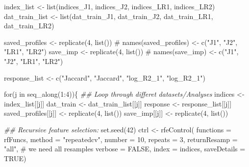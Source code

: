 \documentclass[
  letterpaper,
  DIV=11,
  numbers=noendperiod]{scrreprt}
\newenvironment{Shaded}{\begin{snugshade}}{\end{snugshade}}
\newcommand{\AttributeTok}[1]{\textcolor[rgb]{0.40,0.45,0.13}{#1}}
\newcommand{\CommentTok}[1]{\textcolor[rgb]{0.37,0.37,0.37}{#1}}
\newcommand{\ConstantTok}[1]{\textcolor[rgb]{0.56,0.35,0.01}{#1}}
\newcommand{\ControlFlowTok}[1]{\textcolor[rgb]{0.00,0.23,0.31}{#1}}
\newcommand{\DecValTok}[1]{\textcolor[rgb]{0.68,0.00,0.00}{#1}}
\newcommand{\DocumentationTok}[1]{\textcolor[rgb]{0.37,0.37,0.37}{\textit{#1}}}
\newcommand{\FunctionTok}[1]{\textcolor[rgb]{0.28,0.35,0.67}{#1}}
\newcommand{\NormalTok}[1]{\textcolor[rgb]{0.00,0.23,0.31}{#1}}
\newcommand{\OtherTok}[1]{\textcolor[rgb]{0.00,0.23,0.31}{#1}}
\newcommand{\SpecialCharTok}[1]{\textcolor[rgb]{0.37,0.37,0.37}{#1}}
\newcommand{\StringTok}[1]{\textcolor[rgb]{0.13,0.47,0.30}{#1}}
\begin{document}
\begin{Shaded}
\begin{Highlighting}[]
\NormalTok{index\_list }\OtherTok{\textless{}{-}} \FunctionTok{list}\NormalTok{(indices\_J1, indices\_J2, indices\_LR1, indices\_LR2)}
\NormalTok{dat\_train\_list }\OtherTok{\textless{}{-}} \FunctionTok{list}\NormalTok{(dat\_train\_J1, dat\_train\_J2, dat\_train\_LR1, dat\_train\_LR2)}

\NormalTok{saved\_profiles }\OtherTok{\textless{}{-}} \FunctionTok{replicate}\NormalTok{(}\DecValTok{4}\NormalTok{, }\FunctionTok{list}\NormalTok{())}
\CommentTok{\# names(saved\_profiles) \textless{}{-} c("J1", "J2", "LR1", "LR2")}
\NormalTok{save\_imp }\OtherTok{\textless{}{-}} \FunctionTok{replicate}\NormalTok{(}\DecValTok{4}\NormalTok{, }\FunctionTok{list}\NormalTok{())}
\CommentTok{\# names(save\_imp) \textless{}{-} c("J1", "J2", "LR1", "LR2")}

\NormalTok{response\_list }\OtherTok{\textless{}{-}} \FunctionTok{c}\NormalTok{(}\StringTok{"Jaccard"}\NormalTok{, }\StringTok{"Jaccard"}\NormalTok{, }\StringTok{"log\_R2\_1"}\NormalTok{, }\StringTok{"log\_R2\_1"}\NormalTok{)}

\ControlFlowTok{for}\NormalTok{(j }\ControlFlowTok{in} \FunctionTok{seq\_along}\NormalTok{(}\DecValTok{1}\SpecialCharTok{:}\DecValTok{4}\NormalTok{))\{}
  \DocumentationTok{\#\# Loop through differet datasets/Analyses}
\NormalTok{  indices }\OtherTok{\textless{}{-}}\NormalTok{ index\_list[[j]]}
\NormalTok{  dat\_train }\OtherTok{\textless{}{-}}\NormalTok{ dat\_train\_list[[j]]}
\NormalTok{  response }\OtherTok{\textless{}{-}}\NormalTok{ response\_list[[j]] }
\NormalTok{  saved\_profiles[[j]] }\OtherTok{\textless{}{-}} \FunctionTok{replicate}\NormalTok{(}\DecValTok{4}\NormalTok{, }\FunctionTok{list}\NormalTok{())}
\NormalTok{  save\_imp[[j]] }\OtherTok{\textless{}{-}} \FunctionTok{replicate}\NormalTok{(}\DecValTok{4}\NormalTok{, }\FunctionTok{list}\NormalTok{())}
  
  \DocumentationTok{\#\# Recursive feature selection:}
  \FunctionTok{set.seed}\NormalTok{(}\DecValTok{42}\NormalTok{)}
\NormalTok{  ctrl }\OtherTok{\textless{}{-}} \FunctionTok{rfeControl}\NormalTok{(}
    \AttributeTok{functions =}\NormalTok{ rfFuncs,}
    \AttributeTok{method =} \StringTok{"repeatedcv"}\NormalTok{,}
    \AttributeTok{number =} \DecValTok{10}\NormalTok{,}
    \AttributeTok{repeats =} \DecValTok{3}\NormalTok{,}
    \AttributeTok{returnResamp =} \StringTok{"all"}\NormalTok{, }\CommentTok{\# we need all resamples}
    \AttributeTok{verbose =} \ConstantTok{FALSE}\NormalTok{,}
    \AttributeTok{index =}\NormalTok{ indices,}
    \AttributeTok{saveDetails =} \ConstantTok{TRUE}\NormalTok{)}


\end{Highlighting}
\end{Shaded}
\end{document}
